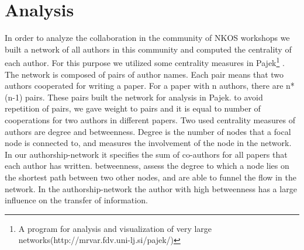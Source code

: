 \documentclass[runningheads,a4paper]{llncs}
\begin{document}
\section{Analysis}\label{analysis}
In order to analyze the collaboration in the community of NKOS workshops we built a network of all authors in this community and computed the centrality of each author. For this purpose we utilized some centrality measures in Pajek\footnote{A program for analysis and visualization of very large networks(http://mrvar.fdv.uni-lj.si/pajek/)} . The network is composed  of pairs of author names. Each pair means that two authors cooperated for writing a paper. For a paper with n authors, there are n*(n-1) pairs. These pairs built the network for analysis in Pajek. to avoid repetition of pairs, we gave weight to pairs and it is equal to number of cooperations for two authors in different papers. 
Two used centrality measures of authors are degree and betweenness. Degree is the number of nodes that a focal node is connected to, and measures the involvement of the node in the network\cite{Opsahl2010}. In our authorship-network it specifies the sum of co-authors for all papers that each author has written. betweenness, assess the degree to which a node lies on the shortest path between two other nodes, and are able to funnel the flow in the network\cite{Opsahl2010}. In the authorship-network the author with high betweenness has a large influence on the transfer of information. 

\end{document}
